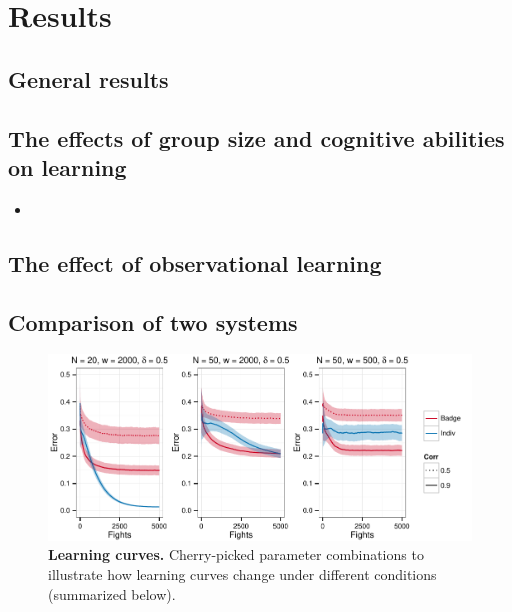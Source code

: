 \section*{Results}
%
\subsection*{General results}

%
\subsection*{The effects of group size and cognitive abilities on learning}
\begin{itemize}

\item 
\end{itemize}
%
\subsection*{The effect of observational learning}
%
\subsection*{Comparison of two systems}
%

\begin{figure}[ht]

\label{learning_curves}
\includegraphics[width=.95\textwidth]{figures/learning_curves.pdf}
\caption{\sffamily\small\textbf{Learning curves.}
     Cherry-picked parameter combinations to illustrate how learning curves change under different conditions (summarized below).}
\end{figure}

